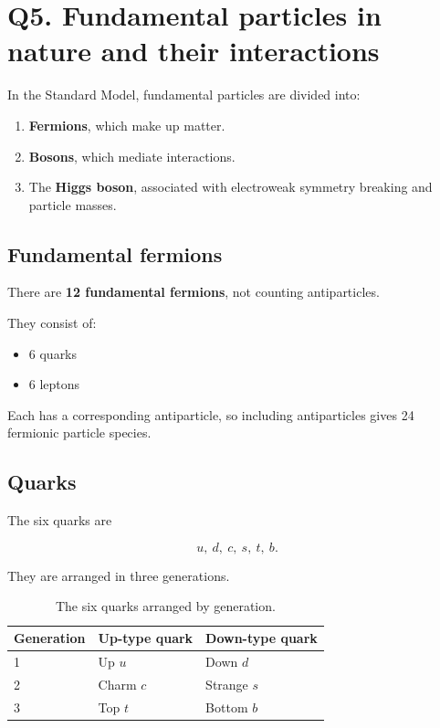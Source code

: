 \documentclass[12pt]{article}
\begin{document}
\section*{Q5. Fundamental particles in nature and their interactions}

In the Standard Model, fundamental particles are divided into:

\begin{enumerate}
    \item \textbf{Fermions}, which make up matter.
    \item \textbf{Bosons}, which mediate interactions.
    \item The \textbf{Higgs boson}, associated with electroweak symmetry breaking and particle masses.
\end{enumerate}

\subsection*{Fundamental fermions}

There are \textbf{12 fundamental fermions}, not counting antiparticles.

They consist of:

\begin{itemize}
    \item 6 quarks
    \item 6 leptons
\end{itemize}

Each has a corresponding antiparticle, so including antiparticles gives 24 fermionic particle species.

\subsection*{Quarks}

The six quarks are

\[
u,\ d,\ c,\ s,\ t,\ b.
\]

They are arranged in three generations.

\begin{table}[h!]
\centering
\begin{tabular}{lll}
\toprule
\textbf{Generation} & \textbf{Up-type quark} & \textbf{Down-type quark} \\
\midrule
1 & Up $u$ & Down $d$ \\
2 & Charm $c$ & Strange $s$ \\
3 & Top $t$ & Bottom $b$ \\
\bottomrule
\end{tabular}
\caption{The six quarks arranged by generation.}
\label{tab:quarks}
\end{table}
\end{document}
